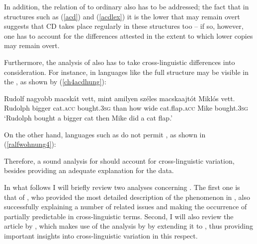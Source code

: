 In addition, the relation of  to ordinary  also has to be addressed; the fact that in structures such as (\ref{acd}) and (\ref{acdlex}) it is the lower  that may remain overt suggests that CD takes place regularly in these structures too -- if so, however, one has to account for the differences attested in the extent to which lower copies may remain overt.

Furthermore, the analysis of  also has to take cross-linguistic differences into consideration. For instance, in languages like  the full structure may be visible in the , as shown by (\ref{ch4acdhung}):

\ea \label{ch4acdhung}
\gll Rudolf nagyobb macsk\'at vett, mint amilyen sz\'eles macskaajt\'ot Mikl\'os vett.\\
Rudolph bigger cat.\textsc{acc}	bought.\textsc{3sg} than how wide cat.flap.\textsc{acc}	Mike	bought.\textsc{3sg}\\
\glt `Rudolph bought a bigger cat then Mike did a cat flap.'
\z

On the other hand, languages such as  do not permit , as shown in (\ref{ralfwohnung4}):

\z

Therefore, a sound analysis for  should account for cross-linguistic variation, besides providing an adequate explanation for the  data.

In what follows I will briefly review two analyses concerning . The first one is that of \citet{kennedymerchant2000}, who provided the most detailed description of the phenomenon in , also successfully explaining a number of related issues and making the occurrence of  partially predictable in cross-linguistic terms. Second, I will also review the article by \citet{reglero2006}, which makes use of the analysis by \citet{kennedymerchant2000} by extending it to , thus providing important insights into cross-linguistic variation in this respect.

